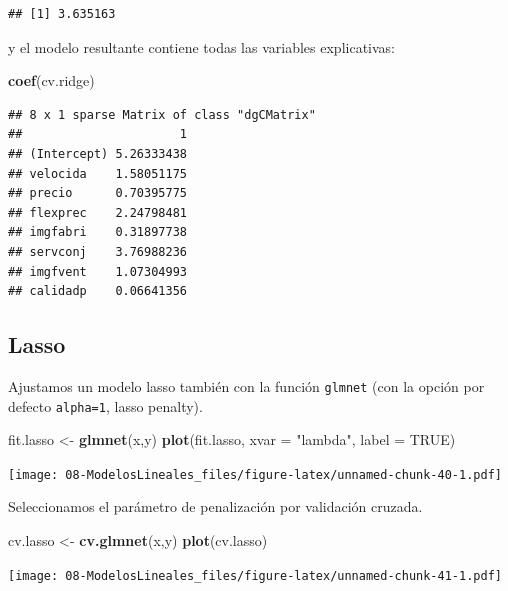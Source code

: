 \documentclass[]{book}
\newenvironment{Shaded}{\begin{snugshade}}{\end{snugshade}}
\newcommand{\DataTypeTok}[1]{\textcolor[rgb]{0.13,0.29,0.53}{#1}}
\newcommand{\KeywordTok}[1]{\textcolor[rgb]{0.13,0.29,0.53}{\textbf{#1}}}
\newcommand{\NormalTok}[1]{#1}
\newcommand{\OtherTok}[1]{\textcolor[rgb]{0.56,0.35,0.01}{#1}}
\newcommand{\StringTok}[1]{\textcolor[rgb]{0.31,0.60,0.02}{#1}}
\begin{document}
\begin{verbatim}
## [1] 3.635163
\end{verbatim}

y el modelo resultante contiene todas las variables explicativas:

\begin{Shaded}
\begin{Highlighting}[]
\KeywordTok{coef}\NormalTok{(cv.ridge)}
\end{Highlighting}
\end{Shaded}

\begin{verbatim}
## 8 x 1 sparse Matrix of class "dgCMatrix"
##                      1
## (Intercept) 5.26333438
## velocida    1.58051175
## precio      0.70395775
## flexprec    2.24798481
## imgfabri    0.31897738
## servconj    3.76988236
## imgfvent    1.07304993
## calidadp    0.06641356
\end{verbatim}

\hypertarget{lasso}{%
\subsection{Lasso}\label{lasso}}

Ajustamos un modelo lasso también con la función \texttt{glmnet} (con la opción por defecto \texttt{alpha=1}, lasso penalty).

\begin{Shaded}
\begin{Highlighting}[]
\NormalTok{fit.lasso <-}\StringTok{ }\KeywordTok{glmnet}\NormalTok{(x,y)}
\KeywordTok{plot}\NormalTok{(fit.lasso, }\DataTypeTok{xvar =} \StringTok{"lambda"}\NormalTok{, }\DataTypeTok{label =} \OtherTok{TRUE}\NormalTok{)}
\end{Highlighting}
\end{Shaded}

\texttt{[image: 08-ModelosLineales\_files/figure-latex/unnamed-chunk-40-1.pdf]}

Seleccionamos el parámetro de penalización por validación cruzada.

\begin{Shaded}
\begin{Highlighting}[]
\NormalTok{cv.lasso <-}\StringTok{ }\KeywordTok{cv.glmnet}\NormalTok{(x,y)}
\KeywordTok{plot}\NormalTok{(cv.lasso)}
\end{Highlighting}
\end{Shaded}

\texttt{[image: 08-ModelosLineales\_files/figure-latex/unnamed-chunk-41-1.pdf]}
\end{document}
